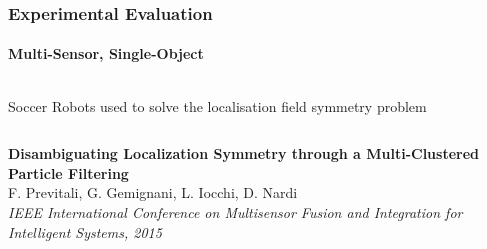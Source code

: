 \begin{frame}
	\frametitle{Experimental Evaluation}
	\framesubtitle{Multi-Sensor, Single-Object}
	
	\large
	
	\vspace{-0.3cm}
	
	\begin{columns}[t]
		{
			
			\begin{block}{Soccer Robots}
				used to solve the localisation field symmetry problem
			\end{block}
			
		}
	\end{columns}
	
	\vspace{0.15cm}
	
	\begin{center}
	\end{center}
	
	\tiny
	
	\textbf{Disambiguating Localization Symmetry through a Multi-Clustered Particle Filtering} \\
	F. Previtali, G. Gemignani, L. Iocchi, D. Nardi \\
	\emph{IEEE International Conference on Multisensor Fusion and Integration for Intelligent Systems,
	2015} \\
\end{frame}

